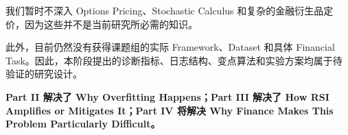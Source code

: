 我们暂时不深入 Options Pricing、Stochastic Calculus 和复杂的金融衍生品定价，因为这些并不是当前研究所必需的知识。

此外，目前仍然没有获得课题组的实际 Framework、Dataset 和具体 Financial Task。因此，本阶段提出的诊断指标、日志结构、变点算法和实验方案均属于待验证的研究设计。

\textbf{Part II 解决了 Why Overfitting Happens；Part III 解决了 How RSI Amplifies or Mitigates It；Part IV 将解决 Why Finance Makes This Problem Particularly Difficult。}
